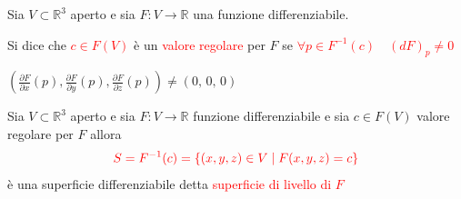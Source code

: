         \newpage
        \begin{definizione}
        Sia $V \subset \mathbb{R}^3$ aperto e sia $F \colon V \to \mathbb{R}$ una funzione differenziabile.

        Si dice che \textcolor{red}{$c \in F(V)$} è un \textcolor{red}{valore regolare} per $F$ se \textcolor{red}{$\forall p \in F^{-1}(c) \quad \left(dF\right)_p \neq 0$}

        \color{blu} $\displaystyle \left( \frac{\partial F}{\partial x}(p), \frac{\partial F}{\partial y}(p), \frac{\partial F}{\partial z}(p) \right) \neq \left(0,\, 0, \, 0\right)$ 
        \end{definizione}
        \begin{proposizione}[\textcolor{violet}{questa prop. definisce una classe di esempi di superfici differenziabili}]
        \label{prop:superficie_di_livello}
        \mbox{}

        Sia $V \subset \mathbb{R}^3$ aperto e sia $F \colon V \to \mathbb{R}$ funzione differenziabile e sia $c \in F(V)$ valore regolare per $F$ allora
        \[ \color{red} S=F^{-1}(c)= \{ (x,y,z) \in V \mid F(x,y,z) = c \} \]
        è una superficie differenziabile detta \textcolor{red}{superficie di livello di $F$}
        \end{proposizione}
